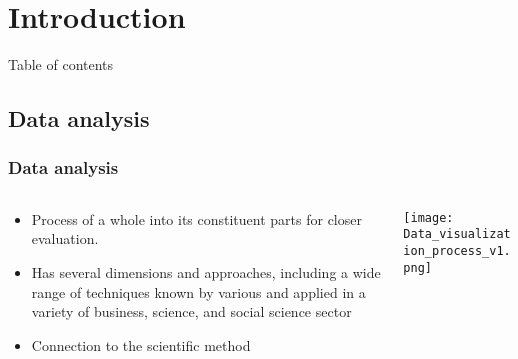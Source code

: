 \section{Introduction}
\SectionPage
\begin{frame}{Table of contents}
    \tableofcontents[currentsection]
\end{frame}

\subsection{Data analysis}
\begin{frame}
    \frametitle{Data analysis}
    \vspace*{\fill}

    \begin{columns}[onlytextwidth, c]
        \begin{column}{0.5\textwidth}
            \begin{itemize}[<+-|alert@+>]
                \item Process of  a whole into its constituent parts for closer evaluation.
                \item Has several dimensions and approaches, including a wide
                      range of techniques known by various  and applied in a variety of
                      business, science, and social science sector
                \item Connection to the scientific method
            \end{itemize}
        \end{column}
        \begin{column}{0.5\textwidth}
            \texttt{[image: Data\_visualization\_process\_v1.png]}
        \end{column}
    \end{columns}
    \vspace*{\fill}
\end{frame}

